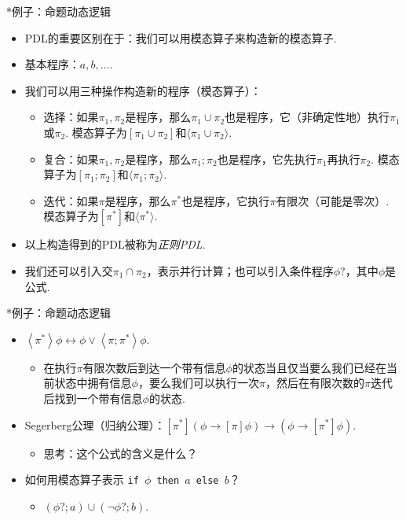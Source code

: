    \begin{frame}{*例子：命题动态逻辑}
    \begin{itemize}
        \item PDL的重要区别在于：我们可以用模态算子来构造新的模态算子.
        \item 基本程序：$a,b,\dots$.
        \item 我们可以用三种操作构造新的程序（模态算子）：
        \begin{itemize}
            \item 选择：如果$\pi_1,\pi_2$是程序，那么$\pi_1\cup\pi_2$也是程序，它（非确定性地）执行$\pi_1$或$\pi_2$. 模态算子为$[\pi_1\cup\pi_2]$和$\langle\pi_1\cup\pi_2\rangle$.
            \item 复合：如果$\pi_1,\pi_2$是程序，那么$\pi_1;\pi_2$也是程序，它先执行$\pi_1$再执行$\pi_2$. 模态算子为$[\pi_1;\pi_2]$和$\langle\pi_1;\pi_2\rangle$.
            \item 迭代：如果$\pi$是程序，那么$\pi^*$也是程序，它执行$\pi$有限次（可能是零次）. 模态算子为$[\pi^*]$和$\langle\pi^*\rangle$.
        \end{itemize}
        \item 以上构造得到的PDL被称为\emph{正则PDL}.
        \item 我们还可以引入交$\pi_1\cap\pi_2$，表示并行计算；也可以引入条件程序$\phi?$，其中$\phi$是公式.
    \end{itemize}
    \end{frame}
    
    \begin{frame}{*例子：命题动态逻辑}
    \begin{itemize}
        \item $\left\langle\pi^*\right\rangle \phi \leftrightarrow \phi \vee\left\langle\pi ; \pi^*\right\rangle \phi$.
        \begin{itemize}
            \item 在执行$\pi$有限次数后到达一个带有信息$\phi$的状态当且仅当要么我们已经在当前状态中拥有信息$\phi$，要么我们可以执行一次$\pi$，然后在有限次数的$\pi$迭代后找到一个带有信息$\phi$的状态.
        \end{itemize}
        \item Segerberg公理（归纳公理）：$[\pi^*](\phi \to [\pi]\phi) \to (\phi \to [\pi^*]\phi).$
        \begin{itemize}
            \item 思考：这个公式的含义是什么？
        \end{itemize}
        \item 如何用模态算子表示
        \texttt{if $\phi$ then $a$ else $b$}？
        \begin{itemize}
            \item $(\phi?;a)\cup(\neg\phi?;b)$.
        \end{itemize}
    \end{itemize}
    \end{frame}
    
